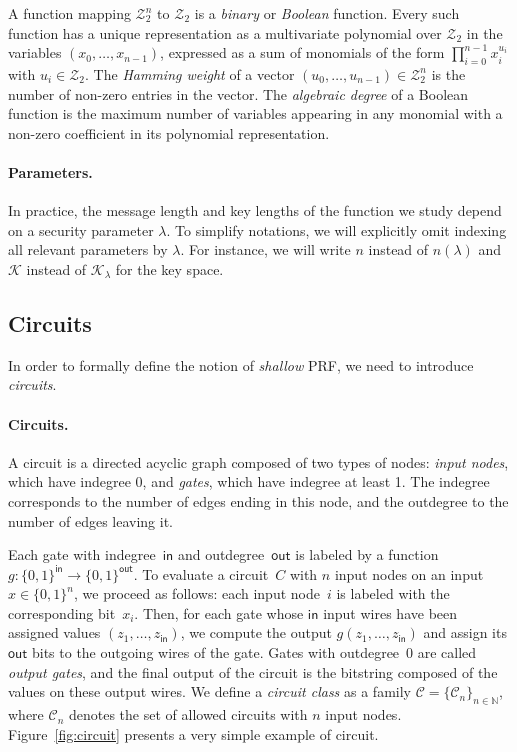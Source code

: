 \documentclass[journal=tosc,submission]{iacrtrans}
\theoremstyle{theorem}
\newcommand\indeg{\ensuremath{\mathsf{in}}\xspace}
\newcommand\outdeg{\ensuremath{\mathsf{out}}\xspace}
\newcommand\Z{\mathcal{Z}}
\begin{document}
A function mapping $\Z_2^n$ to $\Z_2$ is a \emph{binary} or \emph{Boolean} function. Every such function has a unique representation as a multivariate polynomial over $\Z_2$ in the variables $(x_0, \dots, x_{n-1})$, expressed as a sum of monomials of the form $\prod_{i=0}^{n-1} x_i^{u_i}$ with $u_i \in \Z_2$. The \emph{Hamming weight} of a vector $(u_0, \dots, u_{n-1}) \in \Z_2^n$ is the number of non-zero entries in the vector. The \emph{algebraic degree} of a Boolean function is the maximum number of variables appearing in any monomial with a non-zero coefficient in its polynomial representation.

\paragraph{Parameters.}
In practice, the message length and key lengths of the function we study depend on a security parameter $\lambda$. To simplify notations, we will  explicitly omit indexing all relevant parameters by $\lambda$. For instance, we will write $n$ instead of $n(\lambda)$ and $\mathcal{K}$ instead of $\mathcal{K}_{\lambda}$ for the key space.


\subsection{Circuits}

In order to formally define the notion of \emph{shallow} PRF, we need to introduce \emph{circuits}.

\paragraph{Circuits.} A circuit is a directed acyclic graph composed of two types of nodes: \emph{input nodes}, which have indegree 0, and \emph{gates}, which have indegree at least 1. The indegree corresponds to the number of edges ending in this node, and the outdegree to the number of edges leaving it.

Each gate with indegree~$\indeg$ and outdegree~$\outdeg$ is labeled by a function $g: \{0,1\}^\indeg \to \{0,1\}^\outdeg$. To evaluate a circuit~$C$ with $n$ input nodes on an input $x \in \{0,1\}^n$, we proceed as follows: each input node~$i$ is labeled with the corresponding bit~$x_i$. Then, for each gate whose $\indeg$ input wires have been assigned values $(z_1, \dots, z_\indeg)$, we compute the output $g(z_1, \dots, z_\indeg)$ and assign its $\outdeg$ bits to the outgoing wires of the gate. Gates with outdegree~0 are called \emph{output gates}, and the final output of the circuit is the bitstring composed of the values on these output wires. We define a \emph{circuit class} as a family $\mathcal{C} = \{\mathcal{C}_n\}_{n \in \mathbb{N}}$, where $\mathcal{C}_n$ denotes the set of allowed circuits with $n$ input nodes. Figure~\ref{fig:circuit} presents a very simple example of circuit.
\end{document}
